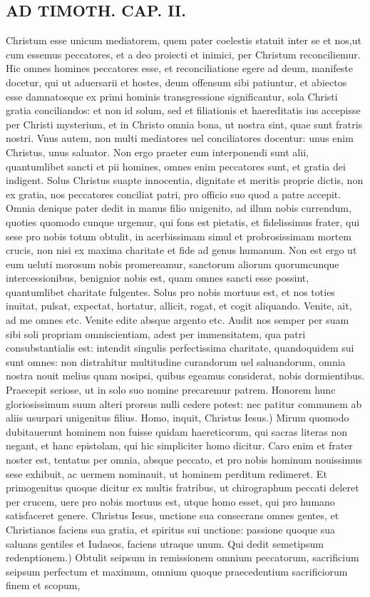 \documentclass{article}
\begin{document}
\begin{pages}
\section*{AD TIMOTH. CAP. II. }
\marginpar{[ p.483 ]}\pstart Christum esse unicum mediatorem, quem pater coelestis statuit inter se et nos,ut cum essemus peccatores, et a deo proiecti et inimici, per Christum reconciliemur. Hic omnes homines peccatores esse, et reconciliatione egere ad deum, manifeste docetur, qui ut aduersarii et hostes, deum offensum sibi patiuntur, et abiectos esse damnatosque ex primi hominis transgressione significantur, sola Christi gratia conciliandos: et non id solum, sed et filiationis et haereditatis ius accepisse per Christi mysterium, et in Christo omnia bona, ut nostra sint, quae sunt fratris nostri. Vnus autem, non multi mediatores uel conciliatores docentur: unus enim Christus, unus saluator. Non ergo praeter eum interponendi sunt alii, quantumlibet sancti et pii homines, omnes enim peccatores sunt, et gratia dei indigent. Solus Christus suapte innocentia, dignitate et meritis proprie dictis, non ex gratia, nos peccatores conciliat patri, pro officio suo quod a patre accepit. Omnia denique pater dedit in manus filio unigenito, ad illum nobis currendum, quoties quomodo cunque urgemur, qui fons est pietatis, et fidelissimus frater, qui sese pro nobis totum obtulit, in acerbissimam simul et probrosissimam mortem crucis, non nisi ex maxima charitate et fide ad genus humanum. Non est ergo ut eum ueluti morosum nobis promereamur, sanctorum aliorum quorumcunque intercessionibus, benignior nobis est, quam omnes sancti esse possint, quantumlibet charitate fulgentes. Solus pro nobis mortuus est, et nos toties inuitat, pulsat, expectat, hortatur, allicit, rogat, et cogit aliquando. Venite, ait, ad me omnes etc. Venite edite absque argento etc. Audit nos semper per suam sibi soli propriam omniscientiam, adest per immensitatem, qua patri consubstantialis est: intendit singulis perfectissima charitate, quandoquidem sui sunt omnes: non distrahitur multitudine curandorum uel saluandorum, omnia nostra nouit melius quam nosipsi, quibus egeamus considerat, nobis dormientibus. Praecepit seriose, ut in solo suo nomine precaremur patrem. Honorem hunc gloriosissimum suum alteri prorsus nulli cedere potest: nec patitur communem ab aliis usurpari unigenitus filius. Homo, inquit, Christus Iesus.) Mirum quomodo dubitauerunt hominem non fuisse quidam haereticorum, qui sacras literas non negant, et hanc epistolam, qui hic simpliciter homo dicitur. Caro enim et frater noster est, tentatus per omnia, absque peccato, et pro nobis hominum nouissimus sese exhibuit, ac uermem nominauit, ut hominem perditum redimeret. Et primogenitus quoque dicitur ex multis fratribus, ut chirographum peccati deleret per crucem, uere pro nobis mortuus est, utque homo esset, qui pro humano satisfaceret genere. Christus Iesus, unctione sua consecrans omnes gentes, et Christianos faciens sua gratia, et spiritus sui unctione: passione quoque sua saluans gentiles et Iudaeos, faciens utraque unum. Qui dedit semetipsum redenptionem.) Obtulit seipsum in remissionem omnium peccatorum, sacrificium seipsum perfectum et maximum, omnium quoque praecedentium sacrificiorum finem et scopum, 
\end{pages}
\end{document}
